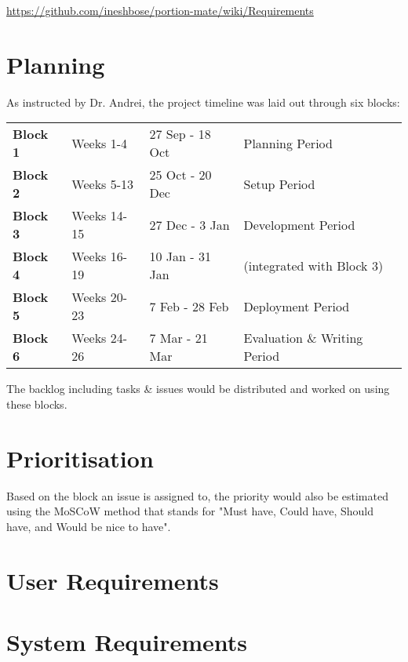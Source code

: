 \documentclass{l4proj}
\begin{document}
\href{https://github.com/ineshbose/portion-mate/wiki/Requirements}{https://github.com/ineshbose/portion-mate/wiki/Requirements}

\section{Planning}

As instructed by Dr. Andrei, the project timeline was laid out through six blocks:

\begin{table}[h]
\begin{tabular}{llll}
\textbf{Block 1} & Weeks 1-4   & 27 Sep - 18 Oct & Planning Period                                 \\
\textbf{Block 2} & Weeks 5-13  & 25 Oct - 20 Dec & Setup Period                                    \\
\textbf{Block 3} & Weeks 14-15 & 27 Dec - 3 Jan  & Development Period                              \\
\textbf{Block 4} & Weeks 16-19 & 10 Jan - 31 Jan & (integrated with Block 3) \\
\textbf{Block 5} & Weeks 20-23 & 7 Feb - 28 Feb  & Deployment Period                               \\
\textbf{Block 6} & Weeks 24-26 & 7 Mar - 21 Mar  & Evaluation \& Writing Period                   
\end{tabular}
\end{table}

The backlog including tasks \& issues would be distributed and worked on using these blocks.

\section{Prioritisation}

Based on the block an issue is assigned to, the priority would also be estimated using the MoSCoW method that stands for "Must have, Could have, Should have, and Would be nice to have".

\section{User Requirements}

\section{System Requirements}
\end{document}
